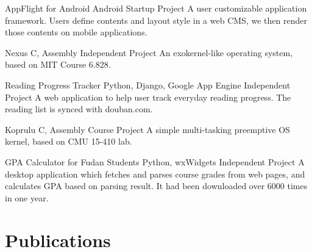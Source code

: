 \documentclass[11pt,a4paper]{moderncv}
\begin{document}
\vspace*{0.2\baselineskip}
{AppFlight for Android}
{Android}
{Startup Project}{}
{
A user customizable application framework. Users define contents and
layout style in a web CMS, we then render those contents on mobile
applications.
}


\vspace*{0.2\baselineskip}
{Nexus}
{C, Assembly}
{Independent Project}{}
{
An exokernel-like operating system, based on MIT Course 6.828.
}


\vspace*{0.2\baselineskip}
{Reading Progress Tracker}
{Python, Django, Google App Engine}
{Independent Project}{}
{
A web application to help user track everyday reading progress. The reading list is synced with douban.com.
}


\vspace*{0.2\baselineskip}
{Koprulu}
{C, Assembly}
{Course Project}{}
{
A simple multi-tasking preemptive OS kernel, based on CMU 15-410 lab.
}

\vspace*{0.2\baselineskip}
{GPA Calculator for Fudan Students}
{Python, wxWidgets}
{Independent Project}{}
{
A desktop application which fetches and parses course grades from web
pages, and calculates GPA based on parsing result. It had been
downloaded over 6000 times in one year.
}


\section{Publications}
\end{document}
